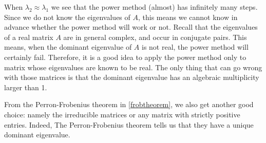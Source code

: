 \documentclass[a4paper,11pt]{report}
\begin{document}
When $\lambda_2 \approx \lambda_1$ we see that the power method (almost) has infinitely 
many steps. Since we do not know the eigenvalues of $A$, this means 
we cannot know in advance whether the power method will work or not. Recall that 
the eigenvalues of a real matrix $A$ are in general complex, and occur in 
conjugate pairs. This means, when the dominant eigenvalue of $A$ is not real, 
the power method will certainly fail. Therefore, it is a good idea to apply the 
power method only to matrix whose eigenvalues are known to be real. The only 
thing that can go wrong with those matrices is that the dominant eigenvalue has 
an algebraic multiplicity larger than 1. 

From the Perron-Frobenius theorem in \ref{frobtheorem}, we also get another good choice: namely the irreducible matrices or any matrix with strictly positive entries.
Indeed, The Perron-Frobenius theorem tells us that they have a unique dominant 
eigenvalue.
\end{document}
